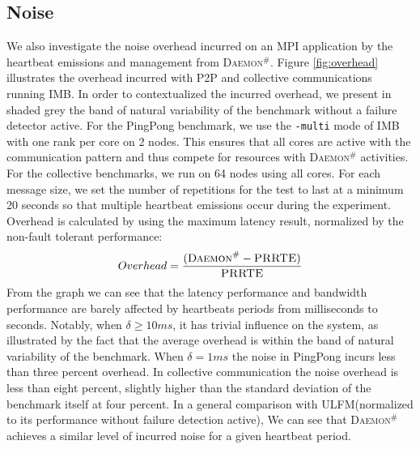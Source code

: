 \documentclass[sigconf]{acmart}
\newcommand{\prrte}[0]{\textsc{PRRTE}\xspace}
\newcommand{\ulfm}[0]{\textsc{ULFM}\xspace}
\newcommand{\ourwork}[0]{\textsc{Daemon}\ensuremath{^\#}\xspace}
\newcommand{\imb}[0]{\textsc{IMB}\xspace}
\begin{document}

\subsection{Noise}
We also investigate the noise overhead incurred on an MPI application by the heartbeat emissions 
and management from \ourwork. 
Figure \ref{fig:overhead} illustrates the overhead incurred with P2P and collective communications running \imb. 
In order to contextualized the incurred overhead, we present in shaded grey the band of natural variability 
of the benchmark without a failure detector active. 
For the PingPong benchmark, we use the \texttt{-multi} mode of IMB with one rank per core on 2 nodes. 
This ensures that all cores are active with the communication pattern and thus
compete for resources with \ourwork activities. 
For the collective benchmarks, we run on 64 nodes using all cores. For each message size, we set the number of 
repetitions for the test to last at a minimum 20 seconds so that multiple heartbeat emissions occur during the experiment. Overhead is calculated by using the maximum latency result, normalized by the non-fault tolerant performance: 
\begin{equation}
Overhead = \frac{( {\ourwork - \prrte} )}{\prrte}
\end{equation}
 From the graph we can see that the latency performance and bandwidth performance are barely affected by heartbeats periods from milliseconds to seconds. Notably, when $ \delta \geq 10 ms $, it has trivial influence on the system, as illustrated by the fact that the average overhead is within the band of natural variability of the benchmark. When  $ \delta = 1 ms $ the noise in PingPong incurs less than three percent overhead. In collective communication the noise overhead is less than eight percent, slightly higher than the standard deviation of the benchmark itself at four percent. 
 In a general comparison with \ulfm (normalized to its performance without failure detection active),
 We can see that \ourwork achieves a similar level of incurred noise for a given 
 heartbeat period. 
\end{document}
